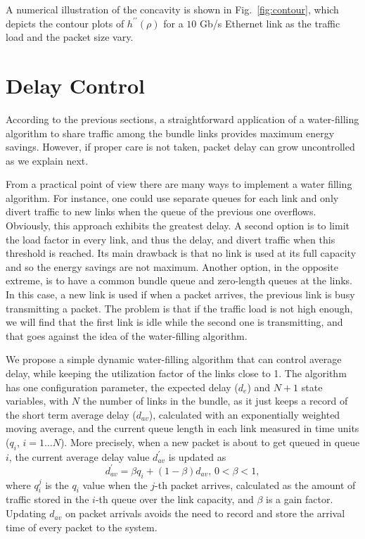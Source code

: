 \documentclass[journal,english,twocolumn,10pt,letterpaper]{IEEEtran}
\newcommand{\added}[1]{{#1}}
\begin{document}
A numerical illustration of the concavity is shown in
\added{Fig.}~\ref{fig:contour}, which depicts the contour plots of
$h^{\prime\prime}(\rho)$ for a $10$ Gb/s Ethernet link as the traffic load and
the packet size vary.

\section{Delay Control}
\label{sec:delay-control}

According to the previous sections, a straightforward application of a
water-filling algorithm to share traffic among the bundle links provides
maximum energy savings. However, if proper care is not taken, packet delay can
grow uncontrolled as we explain next.

From a practical point of view there are many ways to implement a water
filling algorithm. For instance, one could use separate queues for each link
and only divert traffic to new links when the queue of the previous one
overflows. Obviously, this approach exhibits the greatest delay. A second
option is to limit the load factor in every link, and thus the delay, and
divert traffic when this \added{threshold} is reached. Its main drawback is
that no link is used at its full capacity and so the energy savings are not
maximum. Another option, in the opposite extreme, is to have a common bundle
queue and zero-length queues at the links. In this case, a new link is used if
when a packet arrives, the previous link is busy transmitting a packet. The
problem is that if the traffic load is not high enough, we will find that the
first link is idle while the second one is transmitting, and that goes against
the idea of the water-filling algorithm.

We propose a simple dynamic water-filling algorithm that can control average
delay, while keeping the utilization factor of the links close to 1. The
algorithm has one configuration parameter, the expected delay ($d_e$) and
$N+1$ state variables, with $N$ the number of links in the bundle, as it just
keeps a record of the short term average delay ($d_{av}$), calculated with an
exponentially weighted moving average, and the current queue length in each
link measured in time units ($q_i,\,i = 1\ldots N$). \added{More precisely, when a
new packet is about to get queued in queue $i$, the current average delay value
$d_{av}^{\prime}$ is updated as
\begin{equation}
  \label{eq:d-av-exp}
  d_{av}^{\prime} = \beta q_i + (1-\beta) d_{av}, \, 0 < \beta < 1,
\end{equation}
where $q_i^j$ is the $q_i$ value when the $j$-th packet arrives, calculated as the
amount of traffic stored in the $i$-th queue over the link capacity, and
$\beta$ is a gain factor. Updating $d_{av}$ on packet arrivals avoids the need
to record and store the arrival time of every packet to the system.}
\end{document}
